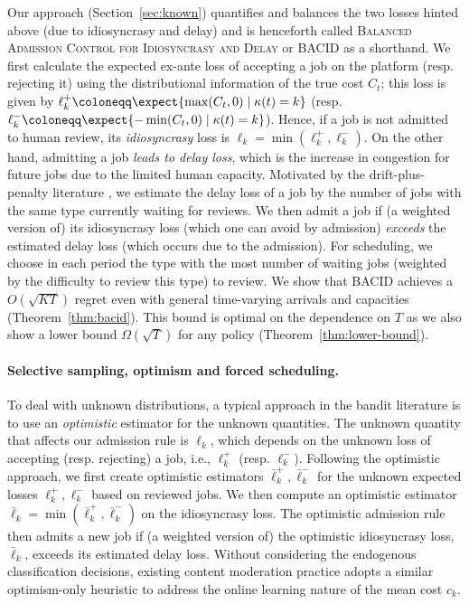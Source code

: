 Our approach (Section~\ref{sec:known}) quantifies and balances the two losses hinted above (due to idiosyncrasy and delay) and is henceforth called \textsc{Balanced Admission Control for Idiosyncrasy and Delay} or \textsc{BACID} as a shorthand. We first calculate the expected ex-ante loss of accepting a job on the platform (resp. rejecting it) using the distributional information of the true cost $C_t$; this loss is given by $\ell_k^+ \coloneqq \expect{\max(C_t,0) \mid \kappa(t)=k}$ (resp. $\ell_k^- \coloneqq \expect{-\min(C_t,0) \mid \kappa(t)=k}$). Hence, if a job is not admitted to human review, its \emph{idiosyncrasy} loss is $\ell_k = \min(\ell_k^+,\ell_k^-)$. On the other hand, admitting a job \emph{leads to delay loss}, which is the increase in congestion for future jobs due to the limited human capacity. Motivated by the drift-plus-penalty literature \citep{stolyar2005maximizing,huang2009delay,neely2022stochastic}, we estimate the delay loss of a job by the number of jobs with the same type currently waiting for reviews. We then admit a job if (a weighted version of) its idiosyncrasy loss (which one can avoid by admission) \emph{exceeds} the estimated delay loss (which occurs due to the admission). For scheduling, we choose in each period the type with the most number of waiting jobs (weighted by the difficulty to review this type) to review. We show that \textsc{BACID} achieves a $O(\sqrt{KT})$  regret even with general time-varying arrivals and capacities (Theorem~\ref{thm:bacid}). This bound is optimal on the dependence on $T$ as we also show a lower bound $\Omega(\sqrt{T})$ for any  policy (Theorem~\ref{thm:lower-bound}).

\paragraph{Selective sampling, optimism and forced scheduling.} 
To deal with unknown distributions, a typical approach in the bandit literature is to use an \emph{optimistic} estimator for the unknown quantities. The unknown quantity that affects our admission rule is $\ell_k$, which depends on the unknown loss of accepting (resp. rejecting) a job, i.e., $\ell_k^+$ (resp. $\ell_k^-$). Following the optimistic approach, we first create optimistic estimators $\bar{\ell}_k^+,\bar{\ell}_k^-$ for the unknown expected losses $\ell_k^+, \ell_k^-$ based on reviewed jobs. We then compute an optimistic estimator $\bar{\ell}_k = \min(\bar{\ell}_k^+,\bar{\ell}_k^-)$ on the idiosyncrasy loss. The optimistic admission rule then admits a new job if (a weighted version of) the optimistic idiosyncrasy loss, $\bar{\ell}_k$, exceeds its estimated delay loss. Without considering the endogenous classification decisions, existing content moderation practice \citep{Avadhanula2022} adopts a similar optimism-only heuristic to address the online learning nature of the mean cost $c_k$.

